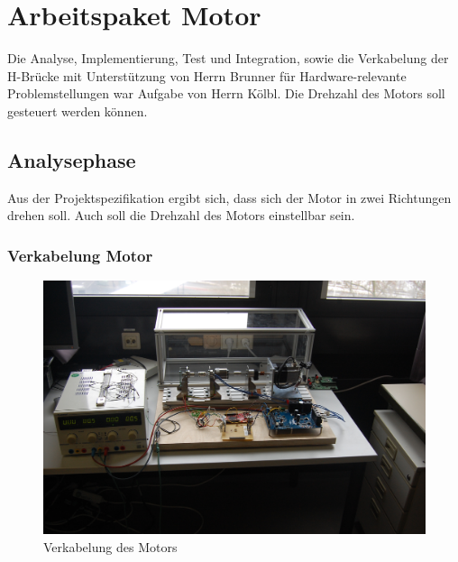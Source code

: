 
\chapter{Arbeitspaket Motor}
Die Analyse, Implementierung, Test und Integration, sowie die Verkabelung der H-Brücke mit Unterst\"utzung von Herrn Brunner f\"ur Hardware-relevante Problemstellungen war Aufgabe von Herrn Kölbl. Die Drehzahl des Motors soll gesteuert werden können.

\section{Analysephase}
Aus der Projektspezifikation ergibt sich, dass sich der Motor in zwei Richtungen drehen soll. Auch soll die Drehzahl des Motors einstellbar sein.

\subsection{Verkabelung Motor}
\begin{figure}
    \includegraphics[width=\textwidth]{motor/MotorWiring.JPG}
    \caption{Verkabelung des Motors}
    \label{fig:MotorWiring}
\end{figure}

